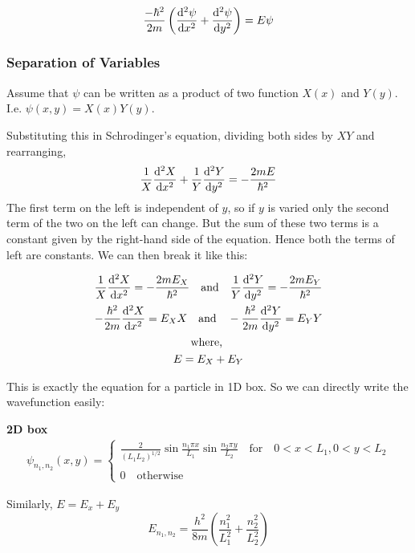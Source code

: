 \documentclass[11pt]{article}
\theoremstyle{definition}
\begin{document}
\begin{equation*}
    \frac{-\hbar^2}{2m} \left(\dv[2]{\psi}{x} + \dv[2]{\psi}{y}\right) = E \psi
\end{equation*}

\subsubsection{Separation of Variables}

Assume that $\psi$ can be written as a product of two function $X(x)$ and $Y(y)$. I.e. $\psi(x,y) = X(x) Y(y)$.

Substituting this in Schrodinger's equation, dividing both sides by $XY$ and rearranging,
\begin{equation*}
    \frac{1}{X}\dv[2]{X}{x} + \frac{1}{Y} \dv[2]{Y}{y} = -\frac{2mE}{\hbar^2}
\end{equation*}
The first term on the left is independent of $y$, so if $y$ is varied only the second term of the two on the left can change. But the sum of these two terms is a constant given by the right-hand side of the equation. Hence both the terms of left are constants. We can then break it like this:

\begin{gather*}
    \frac{1}{X}\dv[2]{X}{x} =-\frac{2mE_X}{\hbar^2} \quad \text{and} \quad \frac{1}{Y}\dv[2]{Y}{y} =-\frac{2mE_Y}{\hbar^2}\\
    -\frac{\hbar^2}{2m} \dv[2]{X}{x} = E_X X \quad \text{and} \quad  -\frac{\hbar^2}{2m} \dv[2]{Y}{y} = E_Y Y\\
    \text{where, }\\
    E = E_X + E_Y
\end{gather*}

This is exactly the equation for a particle in 1D box. So we can directly write the wavefunction easily:

\begin{shaded}
\textbf{2D box}
\begin{gather*}
    \psi_{n_1, n_2}(x,y) = \begin{cases}
    \frac{2}{(L_1 L_2)^{1/2}} \sin{\frac{n_1 \pi x}{L_1}} \sin{\frac{n_2 \pi y}{L_2}} \quad \text{for} \quad 0<x<L_1, 0<y<L_2\\
    \\
    0 \quad \text{otherwise}
    \end{cases}
\end{gather*}

Similarly, $E = E_x + E_y$
\begin{equation*}
    E_{n_1, n_2} = \frac{h^2}{8m} \left(\frac{n_1^2}{L_1^2} + \frac{n_2^2}{L_2^2}\right)
\end{equation*}
\end{shaded}
\end{document}
